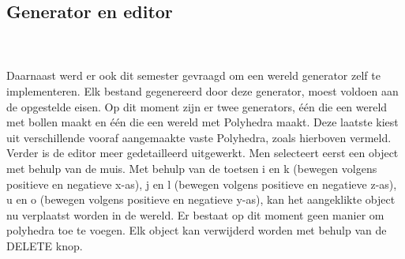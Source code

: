 \subsection{Generator en editor}
\\\\
Daarnaast werd er ook dit semester gevraagd om een wereld generator zelf te implementeren. Elk bestand gegenereerd door deze generator, moest voldoen aan de opgestelde eisen. Op dit moment zijn er twee generators, één die een wereld met bollen maakt en één die een wereld met Polyhedra maakt. Deze laatste kiest uit verschillende vooraf aangemaakte vaste Polyhedra, zoals hierboven vermeld.%
\\

\noindent
Verder is de editor meer gedetailleerd uitgewerkt. Men selecteert eerst een object met behulp van de muis. Met behulp van de toetsen i en k (bewegen volgens positieve en negatieve x-as), j en l (bewegen volgens positieve en negatieve z-as), u en o (bewegen volgens positieve en negatieve y-as), kan het aangeklikte object nu verplaatst worden in de wereld. Er bestaat op dit moment geen manier om polyhedra toe te voegen. Elk object kan verwijderd worden met behulp van de DELETE knop.